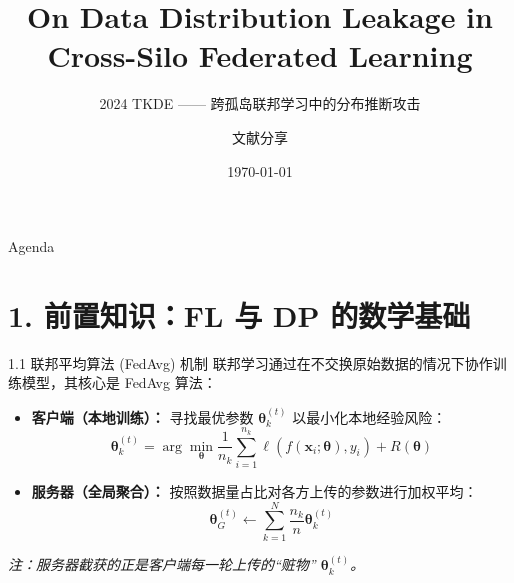 \documentclass[aspectratio=169]{beamer} %
\title[Distribution Leakage in Cross-Silo FL]{On Data Distribution Leakage in Cross-Silo Federated Learning}
\subtitle{2024 TKDE —— 跨孤岛联邦学习中的分布推断攻击}
\author{文献分享}
\date{\today}
\begin{document}
\begin{frame}
    \titlepage
\end{frame}

\begin{frame}{Agenda}
    \tableofcontents[hideallsubsections]
\end{frame}

\section{1. 前置知识：FL 与 DP 的数学基础}

\begin{frame}{1.1 联邦平均算法 (FedAvg) 机制}
    联邦学习通过在不交换原始数据的情况下协作训练模型，其核心是 FedAvg 算法：
    
    \vspace{0.2cm}
    \begin{tcolorbox}[colback=blue!5,colframe=myblue,title=角色动作分解]
        \begin{itemize}
            \item \textbf{客户端（本地训练）：} 寻找最优参数 $\boldsymbol{\theta}_k^{(t)}$ 以最小化本地经验风险：
            \begin{equation}
                \boldsymbol{\theta}_k^{(t)} = \arg\min_{\boldsymbol{\theta}} \frac{1}{n_k} \sum_{i=1}^{n_k} \ell(f(\boldsymbol{x}_i; \boldsymbol{\theta}), y_i) + R(\boldsymbol{\theta})
            \end{equation}
            \item \textbf{服务器（全局聚合）：} 按照数据量占比对各方上传的参数进行加权平均：
            \begin{equation}
                \boldsymbol{\theta}_G^{(t)} \leftarrow \sum_{k=1}^N \frac{n_k}{n} \boldsymbol{\theta}_k^{(t)}
            \end{equation}
        \end{itemize}
    \end{tcolorbox}
    \textit{注：服务器截获的正是客户端每一轮上传的“赃物” $\boldsymbol{\theta}_k^{(t)}$。}
\end{frame}
\end{document}

